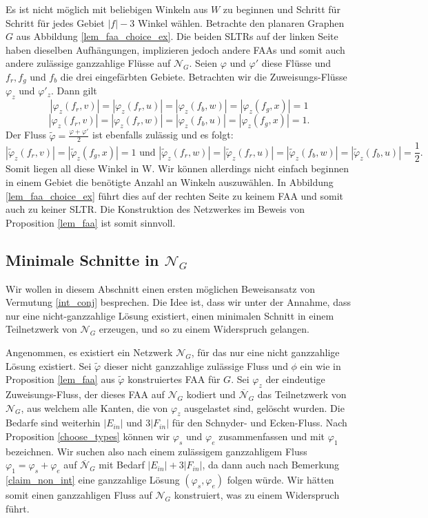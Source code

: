 \begin{example}
Es ist nicht möglich mit beliebigen Winkeln aus $W$ zu beginnen und Schritt für Schritt für jedes Gebiet $|f|-3$ Winkel wählen. Betrachte den planaren Graphen $G$ aus Abbildung \ref{lem_faa_choice_ex}. Die beiden SLTRs auf der linken Seite haben dieselben Aufhängungen, implizieren jedoch andere FAAs und somit auch andere zulässige ganzzahlige Flüsse auf $\mathcal{N}_G$. Seien $\varphi$ und $\varphi'$ diese Flüsse und $f_{r},f_{g}$ und $f_b$ die drei eingefärbten Gebiete. Betrachten wir die Zuweisungs-Flüsse $\varphi_z$ und $\varphi'_z$. Dann gilt $$|\varphi_z(f_r,v)|=|\varphi_z(f_r,u)|=|\varphi_z(f_b,w)| = |\varphi_z(f_g,x)| = 1$$
$$|\varphi_z(f_r,v)|=|\varphi_z(f_r,w)|=|\varphi_z(f_b,u)| = |\varphi_z(f_g,x)| = 1.$$
Der Fluss $\tilde{\varphi}=\frac{\varphi+\varphi'}{2}$ ist ebenfalls zulässig und es folgt:
$$|\tilde{\varphi}_z(f_r,v)|=|\tilde{\varphi}_z(f_g,x)| = 1 \text{ und } |\tilde{\varphi}_z(f_r,w)|=|\tilde{\varphi}_z(f_r,u)| = |\tilde{\varphi}_z(f_b,w)|=|\tilde{\varphi}_z(f_b,u)| = \frac{1}{2}.$$
Somit liegen all diese Winkel in W. Wir können allerdings nicht einfach beginnen in einem Gebiet die benötigte Anzahl an Winkeln auszuwählen. In Abbildung \ref{lem_faa_choice_ex} führt dies auf der rechten Seite zu keinem FAA und somit auch zu keiner SLTR. Die Konstruktion des Netzwerkes im Beweis von Proposition \ref{lem_faa} ist somit sinnvoll.
\end{example}

\subsection{Minimale Schnitte in $\mathcal{N}_G$}

Wir wollen in diesem Abschnitt einen ersten möglichen Beweisansatz von Vermutung \ref{int_conj} besprechen. Die Idee ist, dass wir unter der Annahme, dass nur eine nicht-ganzzahlige Lösung existiert, einen minimalen Schnitt in einem Teilnetzwerk von $\mathcal{N}_G$ erzeugen, und so zu einem Widerspruch gelangen. 

Angenommen, es existiert ein Netzwerk $\mathcal{N}_G$, für das nur eine nicht ganzzahlige Lösung existiert. Sei $\tilde{\varphi}$ dieser nicht ganzzahlige zulässige Fluss und $\phi$ ein wie in Proposition \ref{lem_faa} aus $\tilde{\varphi}$ konstruiertes FAA für $G$. Sei $\varphi_z$ der eindeutige Zuweisungs-Fluss, der dieses FAA auf $\mathcal{N}_G$ kodiert und $\overline{\mathcal{N}}_G$ das Teilnetzwerk von $\mathcal{N}_G$, aus welchem alle Kanten, die von $\varphi_z$ ausgelastet sind, gelöscht wurden. Die Bedarfe sind weiterhin $|E_{in}|$ und $3|F_{in}|$ für den Schnyder- und Ecken-Fluss. Nach Proposition \ref{choose_types} können wir $\varphi_s$ und $\varphi_e$ zusammenfassen und mit $\varphi_1$ bezeichnen. Wir suchen also nach einem zulässigem ganzzahligem Fluss $\varphi_1 = \varphi_s + \varphi_e$ auf $\overline{\mathcal{N}}_G$ mit Bedarf $|E_{in}| + 3|F_{in}|$, da dann auch nach Bemerkung \ref{claim_non_int} eine ganzzahlige Lösung $(\varphi_s,\varphi_e)$ folgen würde. Wir hätten somit einen ganzzahligen Fluss auf $\mathcal{N}_G$ konstruiert, was zu einem Widerspruch führt.

